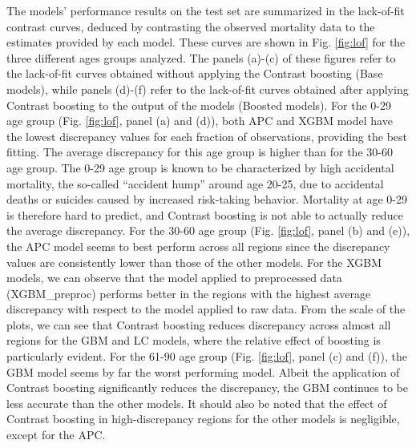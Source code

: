 \documentclass[a4,11pt]{article}
\begin{document}
The models' performance results on the test set are summarized in the lack-of-fit contrast curves, deduced by contrasting the observed mortality data to the estimates provided by each model. These curves are shown in Fig. \ref{fig:lof} for the three different ages groups analyzed. The panels (a)-(c) of these figures refer to the lack-of-fit curves obtained without applying the Contrast boosting (Base models), while panels (d)-(f) refer to the lack-of-fit curves obtained after applying Contrast boosting to the output of the models (Boosted models).
For the 0-29 age group (Fig. \ref{fig:lof}, panel (a) and (d)), both APC and XGBM model have the lowest discrepancy values for each fraction of observations, providing the best fitting. The average discrepancy for this age group is higher than for the 30-60 age group. The 0-29 age group is known to be characterized by high accidental mortality, the so-called “accident hump” around age 20-25, due to accidental deaths or suicides caused by increased risk-taking behavior. Mortality at age 0-29 is therefore hard to predict, and Contrast boosting is not able to actually reduce the average discrepancy. 
For the 30-60 age group (Fig. \ref{fig:lof}, panel (b) and (e)), the APC model seems to best perform across all regions since the discrepancy values are consistently lower than those of the other models. For the XGBM models, we can observe that the model applied to preprocessed data (XGBM\_preproc) performs better in the regions with the highest average discrepancy with respect to the model applied to raw data. From the scale of the plots, we can see that Contrast boosting reduces discrepancy across almost all regions for the GBM and LC models, where the relative effect of boosting is particularly evident. 
For the 61-90 age group (Fig. \ref{fig:lof}, panel (c) and (f)), the GBM model seems by far the worst performing model. 
Albeit the application of Contrast boosting significantly reduces the discrepancy, the GBM continues to be less accurate than the other models. It should also be noted that the effect of Contrast boosting in high-discrepancy regions for the other models is negligible, except for the APC.
\end{document}
